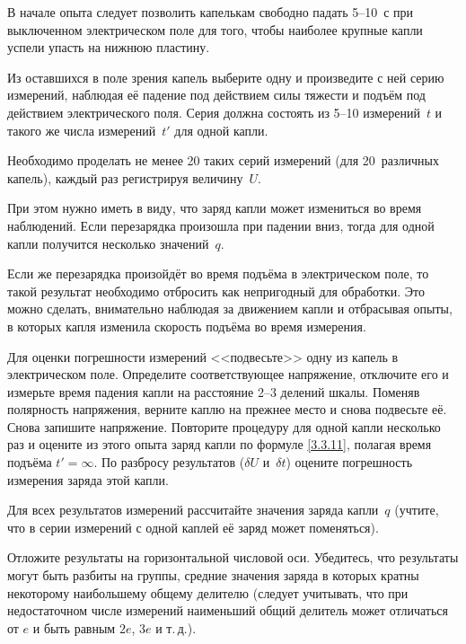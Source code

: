 \begin{lab:task}
\item В начале опыта следует позволить капелькам свободно падать 5--10~с 
при выключенном электрическом поле для того, чтобы наиболее крупные
капли успели упасть на нижнюю пластину.

Из оставшихся в поле зрения капель выберите одну и произведите с ней серию
измерений, наблюдая её падение под действием силы тяжести и подъём под действием
электрического поля. Серия должна состоять из 5--10 измерений~$t$ и такого
же числа измерений~$t'$ для одной капли.

\item Необходимо проделать не менее 20 таких серий измерений (для 20~различных
капель), каждый раз регистрируя величину~$U$. 

При этом нужно иметь в виду, что заряд капли может измениться во время наблюдений.
Если перезарядка произошла при падении вниз, тогда для одной
капли получится несколько значений~$q$.

Если же перезарядка произойдёт во время подъёма в электрическом поле,
то такой результат необходимо отбросить как непригодный для обработки. 
Это можно сделать, внимательно наблюдая за движением капли и отбрасывая опыты, 
в которых капля изменила скорость подъёма во время измерения.

\item Для оценки погрешности измерений <<подвесьте>> одну из капель в электрическом
поле. Определите соответствующее напряжение, отключите его  и измерьте время
падения капли на расстояние 2--3 делений шкалы. Поменяв полярность
напряжения, верните каплю на прежнее место и снова подвесьте её. Снова запишите
напряжение. Повторите  процедуру  для одной капли несколько раз и 
оцените из этого опыта заряд капли по формуле \eqref{3.3.11}, полагая время
подъёма $t'=\infty$. 
По разбросу результатов ($\delta U$ и~$\delta t$) оцените
погрешность измерения заряда этой капли.


\item Для всех результатов измерений рассчитайте значения заряда капли~$q$
(учтите, что в серии измерений с одной каплей её заряд может поменяться).

\item Отложите результаты на горизонтальной числовой оси. Убедитесь, что
результаты могут быть разбиты на группы, средние значения заряда в которых
кратны некоторому наибольшему общему делителю
(следует учитывать, что при недостаточном числе измерений 
наименьший общий делитель может отличаться от $e$ и быть равным $2e$, $3e$ и т.\,д.).


\end{lab:task}
